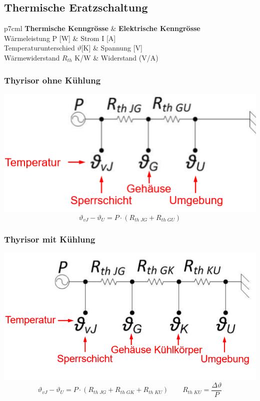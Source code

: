 \subsection{Thermische Eratzschaltung}
\begin{tabular}{p{7cm}l}
	\textbf{Thermische Kenngrösse}			& \textbf{Elektrische Kenngrösse}\\
	Wärmeleistung P [W]						& Strom I  [A]\\
	Temperaturunterschied $ \vartheta $[K] 	& Spannung [V]\\
	Wärmewiderstand $ R_{th} $ {K/W}		& Widerstand (V/A)\\
\end{tabular}

\begin{multicols}{2}
	\begin{minipage}{\linewidth}
		\subsubsection{Thyrisor ohne Kühlung}
		\includegraphics[width=0.6\linewidth]{images/thyrOK}
		\[ \vartheta_{vJ}-\vartheta_U=P \cdot (R_{th\; JG}+R_{th\; GU}) \]		
	\end{minipage}

	\begin{minipage}{\linewidth}
		\subsubsection{Thyrisor mit Kühlung}
		\includegraphics[width=0.6\linewidth]{images/thyrMK}
		\[ \vartheta_{vJ}-\vartheta_U=P \cdot (R_{th\; JG}+R_{th\; GK}+R_{th\; KU})\qquad R_{th \; KU}=\dfrac{\Delta \vartheta}{P} \]	
	\end{minipage}
\end{multicols}

